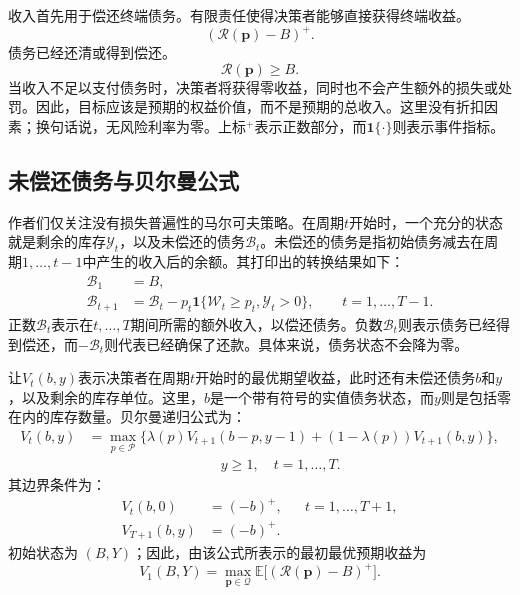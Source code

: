 \documentclass{article}
\begin{document}
收入首先用于偿还终端债务。有限责任使得决策者能够直接获得终端收益。
\[
(\mathcal R(\mathbf p)-B)^+.
\]
债务已经还清或得到偿还。
\[
\mathcal R(\mathbf p)\ge B.
\]
当收入不足以支付债务时，决策者将获得零收益，同时也不会产生额外的损失或处罚。因此，目标应该是预期的权益价值，而不是预期的总收入。这里没有折扣因素；换句话说，无风险利率为零。上标\({}^+\)表示正数部分，而\(\mathbf 1\{\cdot\}\)则表示事件指标。

\subsection*{未偿还债务与贝尔曼公式}

作者们仅关注没有损失普遍性的马尔可夫策略。在周期\(t\)开始时，一个充分的状态就是剩余的库存\(\mathcal Y_t\)，以及未偿还的债务\(\mathcal B_t\)。未偿还的债务是指初始债务减去在周期\(1,\ldots,t-1\)中产生的收入后的余额。其打印出的转换结果如下：
\[
\begin{aligned}
\mathcal B_1&=B,\\
\mathcal B_{t+1}
&=\mathcal B_t-p_t\mathbf 1\{\mathcal W_t\ge p_t,\mathcal Y_t>0\},
\qquad t=1,\ldots,T-1.
\end{aligned}
\]
正数\(\mathcal B_t\)表示在\(t,\ldots,T\)期间所需的额外收入，以偿还债务。负数\(\mathcal B_t\)则表示债务已经得到偿还，而\(-\mathcal B_t\)则代表已经确保了还款。具体来说，债务状态不会降为零。

让\(V_t(b,y)\)表示决策者在周期\(t\)开始时的最优期望收益，此时还有未偿还债务\(b\)和\(y\)，以及剩余的库存单位。这里，\(b\)是一个带有符号的实值债务状态，而\(y\)则是包括零在内的库存数量。贝尔曼递归公式为：
\begin{equation}
\begin{aligned}
V_t(b,y)
&=\max_{p\in\mathcal P}
\bigl\{\lambda(p)V_{t+1}(b-p,y-1)
 +(1-\lambda(p))V_{t+1}(b,y)\bigr\},\\
&\hspace{4cm}y\ge1,\quad t=1,\ldots,T.
\end{aligned}
\tag{2}
\end{equation}
其边界条件为：
\begin{equation}
\begin{aligned}
V_t(b,0)&=(-b)^+,
&&t=1,\ldots,T+1,\\
V_{T+1}(b,y)&=(-b)^+.
\end{aligned}
\tag{3}
\end{equation}
初始状态为 \((B,Y)\)；因此，由该公式所表示的最初最优预期收益为
\[
V_1(B,Y)=\max_{\mathbf p\in\mathcal Q}
\mathbb E\bigl[(\mathcal R(\mathbf p)-B)^+\bigr].
\]
\end{document}
